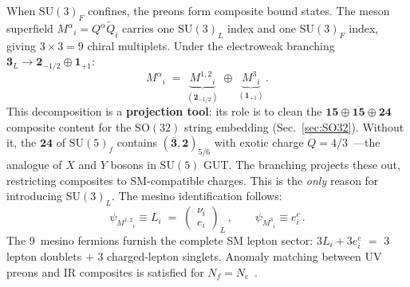 \documentclass[aps,prd,twocolumn,showpacs,preprintnumbers,superscriptaddress,floatfix]{revtex4-2}
\newcommand{\SU}{\mathrm{SU}}
\newcommand{\SO}{\mathrm{SO}}
\newcommand{\Nf}{N_{\!f}}
\newcommand{\Nc}{N_{\!c}}
\begin{document}
When $\SU(3)_F$ confines, the preons form composite bound states.
The meson superfield $M^\alpha{}_i = Q^\alpha\tilde{Q}_i$ carries
one $\SU(3)_L$ index and one $\SU(3)_F$ index, giving
$3 \times 3 = 9$ chiral multiplets.
Under the electroweak branching
$\mathbf{3}_L \to \mathbf{2}_{-1/2} \oplus \mathbf{1}_{+1}$:
\begin{equation}
  M^\alpha{}_i \;=\;
  \underbrace{M^{1,2}{}_i}_{(\mathbf{2}_{-1/2})}
  \;\oplus\;
  \underbrace{M^{3}{}_i}_{(\mathbf{1}_{+1})}\,.
  \label{eq:meson_decomp}
\end{equation}
This decomposition is a \textbf{projection tool}: its role is
to clean the $\mathbf{15} \oplus \overline{\mathbf{15}} \oplus
\mathbf{24}$ composite content for the $\SO(32)$ string embedding
(Sec.~\ref{sec:SO32}).
Without it, the $\mathbf{24}$ of $\SU(5)_f$ contains
$(\overline{\mathbf{3}}, \mathbf{2})_{5/6}$ with exotic charge
$Q = 4/3$~\cite{Rivero:2024epjc}---the analogue of $X$ and $Y$
bosons in $\SU(5)$ GUT.
The branching projects these out, restricting composites to
SM-compatible charges.
This is the \emph{only} reason for introducing $\SU(3)_L$.
The mesino identification follows:
\begin{equation}
  \boxed{
  \psi_{M^{1,2}{}_i} \equiv L_i
  \;=\; \begin{pmatrix} \nu_i \\ e_i \end{pmatrix}_L\,,
  \qquad
  \psi_{M^{3}{}_i} \equiv e^c_i\,.}
  \label{eq:mesinos_leptons}
\end{equation}
The 9~mesino fermions furnish the complete SM lepton sector:
$3L_i + 3e^c_i$ $=$ 3 lepton doublets $+$ 3 charged-lepton
singlets.
Anomaly matching between UV preons and IR composites is satisfied
for $\Nf = \Nc$~\cite{CsakiSchmaltzSkiba:1997}.
\end{document}
